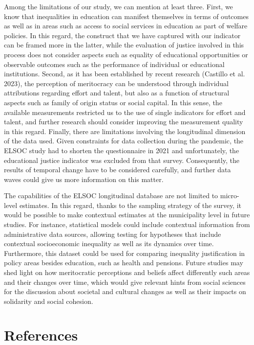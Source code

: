 \documentclass[
]{article}
\begin{document}
Among the limitations of our study, we can mention at least three.
First, we know that inequalities in education can manifest themselves in
terms of outcomes as well as in areas such as access to social services
in education as part of welfare policies. In this regard, the construct
that we have captured with our indicator can be framed more in the
latter, while the evaluation of justice involved in this process does
not consider aspects such as equality of educational opportunities or
observable outcomes such as the performance of individual or educational
institutions. Second, as it has been established by recent research
(Castillo et al. 2023), the perception of meritocracy can be understood
through individual attributions regarding effort and talent, but also as
a function of structural aspects such as family of origin status or
social capital. In this sense, the available measurements restricted us
to the use of single indicators for effort and talent, and further
research should consider improving the measurement quality in this
regard. Finally, there are limitations involving the longitudinal
dimension of the data used. Given constraints for data collection during
the pandemic, the ELSOC study had to shorten the questionnaire in 2021
and unfortunately, the educational justice indicator was excluded from
that survey. Consequently, the results of temporal change have to be
considered carefully, and further data waves could give us more
information on this matter.

The capabilities of the ELSOC longitudinal database are not limited to
micro-level estimates. In this regard, thanks to the sampling strategy
of the survey, it would be possible to make contextual estimates at the
municipality level in future studies. For instance, statistical models
could include contextual information from administrative data sources,
allowing testing for hypotheses that include contextual socioeconomic
inequality as well as its dynamics over time. Furthermore, this dataset
could be used for comparing inequality justification in policy areas
besides education, such as health and pensions. Future studies may shed
light on how meritocratic perceptions and beliefs affect differently
such areas and their changes over time, which would give relevant hints
from social sciences for the discussion about societal and cultural
changes as well as their impacts on solidarity and social cohesion.

\section{References}\label{references}
\end{document}
